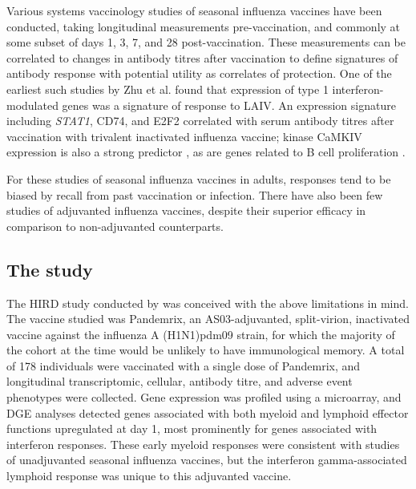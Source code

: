Various systems vaccinology studies of seasonal influenza vaccines have been conducted, taking longitudinal measurements pre-vaccination, and commonly at some subset of days 1, 3, 7, and 28 post-vaccination.
These measurements can be correlated to changes in antibody titres after vaccination to define signatures of antibody response with potential utility as correlates of protection.
One of the earliest such studies by Zhu et al.\autocite{zhu2010WholeGenomeTranscriptional} found that expression of type 1 interferon-modulated genes was a signature of response to \gls{LAIV}.
An expression signature including \textit{STAT1}, CD74, and E2F2 correlated with serum antibody titres after vaccination with trivalent inactivated influenza vaccine\autocite{bucasas2011EarlyPatternsGene}; kinase CaMKIV expression is also a strong predictor \autocite{nakaya2011SystemsBiologyVaccination}, as are genes related to B cell proliferation \autocite{tan2014GeneSignaturesRelated}.

For these studies of seasonal influenza vaccines in adults, responses tend to be biased by recall from past vaccination or infection\autocite{bucasas2011EarlyPatternsGene, nakaya2012SystemsVaccinologyLearning}.
There have also been few studies of adjuvanted influenza vaccines, despite their superior efficacy in comparison to non-adjuvanted counterparts\autocite{wilkins2017AS03MF59AdjuvantedInfluenza,tregoning2018AdjuvantedInfluenzaVaccines}.

\subsection{The  study}

The \gls{HIRD} study conducted by \textcite{sobolev2016AdjuvantedInfluenzaH1N1Vaccination} was conceived with the above limitations in mind.
The vaccine studied was Pandemrix, an AS03-adjuvanted, split-virion, inactivated vaccine against the influenza A (H1N1)pdm09 strain, for which the majority of the cohort at the time would be unlikely to have immunological memory.
A total of 178 individuals were vaccinated with a single dose of Pandemrix, and longitudinal transcriptomic, cellular, antibody
titre, and adverse event phenotypes were collected.
Gene expression was profiled using a microarray, and \gls{DGE} analyses detected genes associated with both myeloid and lymphoid effector functions upregulated at day 1, most prominently for genes associated with interferon responses.
These early myeloid responses were consistent with studies of unadjuvanted seasonal influenza vaccines, but the interferon gamma-associated lymphoid response was unique to this adjuvanted vaccine.

